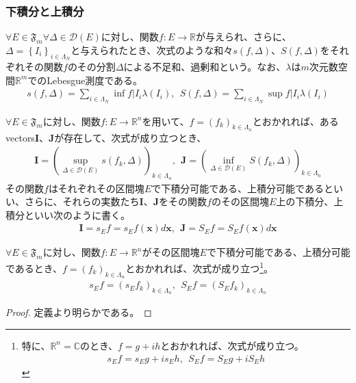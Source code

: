 \documentclass[dvipdfmx]{jsarticle}
\begin{document}
\subsubsection{下積分と上積分}%
\begin{dfn}
$\forall E \in \mathfrak{F}_{m}\forall\varDelta \in \mathcal{D}(E)$に対し、関数$f:E \rightarrow \mathbb{R}$が与えられ、さらに、$\varDelta = \left\{ I_{i} \right\}_{i \in \varLambda_{N}}$と与えられたとき、次式のような和々$s(f,\varDelta)$、$S(f,\varDelta)$をそれぞれその関数$f$のその分割$\varDelta$による不足和、過剰和という。なお、$\lambda$は$m$次元数空間$\mathbb{R}^{m}$でのLebesgue測度である。
\begin{align*}
s(f,\varDelta) = \sum_{i \in \varLambda_{N}} {\inf{f|I_{i}}\lambda\left( I_{i} \right)},\ \ S(f,\varDelta) = \sum_{i \in \varLambda_{N}} {\sup{f|I_{i}}\lambda\left( I_{i} \right)}
\end{align*}
\end{dfn}
\begin{dfn}
$\forall E \in \mathfrak{F}_{m}$に対し、関数$f:E \rightarrow \mathbb{R}^{n}$を用いて、$f = \left( f_{k} \right)_{k \in \varLambda_{n}}$とおかれれば、あるvectors$\mathbf{I}$、$\mathbf{J}$が存在して、次式が成り立つとき、
\begin{align*}
\mathbf{I} = \left( \sup_{\varDelta \in \mathcal{D}(E)}{s\left( f_{k},\varDelta \right)} \right)_{k \in \varLambda_{n}},\ \ \mathbf{J} = \left( \inf_{\varDelta \in \mathcal{D}(E)}{S\left( f_{k},\varDelta \right)} \right)_{k \in \varLambda_{n}}
\end{align*}
その関数$f$はそれぞれその区間塊$E$で下積分可能である、上積分可能であるといい、さらに、それらの実数たち$\mathbf{I}$、$\mathbf{J}$をその関数$f$のその区間塊$E$上の下積分、上積分といい次のように書く。
\begin{align*}
\mathbf{I} = s_{E}f = s_{E}f\left( \mathbf{x} \right)d\mathbf{x},\ \ \mathbf{J} = S_{E}f = S_{E}f\left( \mathbf{x} \right)d\mathbf{x}
\end{align*}
\end{dfn}
\begin{thm}\label{4.6.5.8}
$\forall E \in \mathfrak{F}_{m}$に対し、関数$f:E \rightarrow \mathbb{R}^{n}$がその区間塊$E$で下積分可能である、上積分可能であるとき、$f = \left( f_{k} \right)_{k \in \varLambda_{n}}$とおかれれば、次式が成り立つ\footnote{特に、$\mathbb{R}^{n} = \mathbb{C}$のとき、$f = g + ih$とおかれれば、次式が成り立つ。
\begin{align*}
s_{E}f = s_{E}g + is_{E}h,\ \ S_{E}f = S_{E}g + iS_{E}h
\end{align*}}。
\begin{align*}
s_{E}f = \left( s_{E}f_{k} \right)_{k \in \varLambda_{n}},\ \ S_{E}f = \left( S_{E}f_{k} \right)_{k \in \varLambda_{n}}
\end{align*}
\end{thm}
\begin{proof} 定義より明らかである。
\end{proof}
\end{document}
